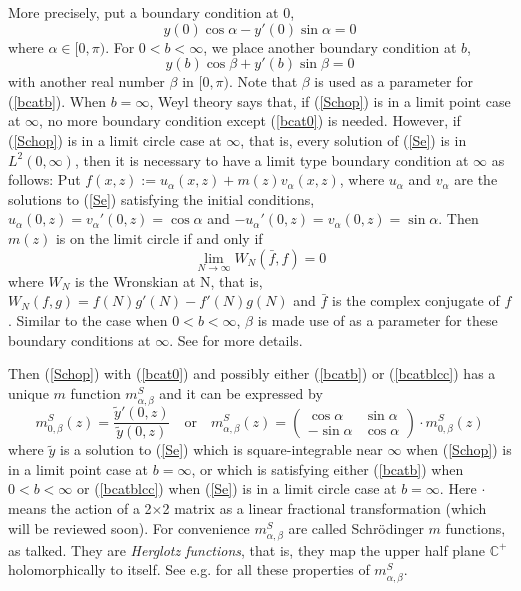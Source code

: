 \documentclass[preprint,12pt]{elsarticle}
\newcommand{\C}{{\mathbb C}}
\begin{document}
More precisely,  put a boundary condition at 0, 
\begin{equation}
\label{bcat0}
y(0) \cos\alpha-y'(0) \sin\alpha=0
\end{equation} 
where $\alpha \in [0,\pi)$. For $0<b<\infty$, we place another boundary condition at $b$, 
\begin{equation}
\label{bcatb}
y(b) \cos\beta+y'(b) \sin\beta=0
\end{equation}
with another real number $\beta$ in $[0,\pi)$. Note that $\beta$ is used as a parameter for (\ref{bcatb}). When $b=\infty$, Weyl theory says that, if (\ref{Schop}) is in a limit point case at $\infty$, no more boundary condition except (\ref{bcat0}) is needed. However, if (\ref{Schop}) is in a limit circle case at $\infty$, that is, every solution of (\ref{Se}) is in $L^2(0,\infty)$, then it is necessary to have a limit type boundary condition at $\infty$ as follows:  Put $f(x,z):=u_{\alpha}(x,z)+m(z)v_{\alpha}(x,z)$, where $u_{\alpha}$ and $v_{\alpha}$ are the solutions to (\ref{Se}) satisfying the initial conditions, $u_{\alpha}(0,z)=v_{\alpha}'(0,z)=\cos\alpha$ and $-u_{\alpha}'(0,z)=v_{\alpha}(0,z)=\sin\alpha$. Then $m(z)$ is on the limit circle if and only if 
\begin{equation}
\label{bcatblcc}
\lim_{N\to\infty} W_N(\bar{f}, f)=0
\end{equation}
where $W_N$ is the Wronskian at N, that is, $W_N(f,g)=f(N)g'(N)-f'(N)g(N)$ and $\bar{f}$ is the complex conjugate of $f$. Similar to the case when $0<b<\infty$, $\beta$ is made use of as a parameter for these boundary conditions at $\infty$. See \cite{CodLev,Weid} for more details.

Then (\ref{Schop}) with (\ref{bcat0}) and possibly either (\ref{bcatb}) or (\ref{bcatblcc}) has a unique $m$ function $m^S_{\alpha, \beta}$  and it can be expressed by 
\begin{equation}
\label{mfnforSe}
m^S_{0, \beta}(z)=\frac{\tilde{y}'(0,z)}{\tilde{y}(0,z)}\quad \textrm{or}
\quad
m^S_{\alpha, \beta}(z)=\begin{pmatrix}  \cos\alpha & \sin\alpha \\ -\sin\alpha & \cos\alpha \end{pmatrix} \cdot
m^S_{0, \beta}(z)
\end{equation}
where $\tilde{y}$ is a solution to (\ref{Se}) which is square-integrable near $\infty$ when (\ref{Schop}) is in a limit point case at $b=\infty$, or which is satisfying either (\ref{bcatb}) when $0<b<\infty$ or (\ref{bcatblcc}) when (\ref{Se}) is in a limit circle case at $b=\infty$. Here $\cdot$ means the action of a 2$\times$2 matrix as a linear fractional transformation (which will be reviewed soon).  
For convenience $m_{\alpha,\beta}^S$ are called Schr\"odinger $m$ functions, as talked. They are \textit{Herglotz functions}, that is, they map the upper half plane $\C^+$ holomorphically to itself. See e.g. \cite{LS} for all these properties of $m_{\alpha,\beta}^S$.
\end{document}
